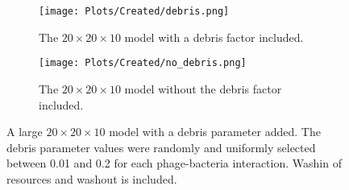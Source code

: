\begin{figure}
    \centering
    \begin{subfigure}{1\linewidth}
        \centering
        \texttt{[image: Plots/Created/debris.png]}
        \caption{
            The $20\times20\times10$ model with a debris factor included. 
        }
        \label{fig:created:debris_model}
    \end{subfigure}
    \hfill
    \begin{subfigure}{1\linewidth}
        \centering
        \texttt{[image: Plots/Created/no\_debris.png]}
        \caption{
            The $20\times20\times10$ model without the debris factor included. 
        }
        \label{fig:created:no_debris_model}
    \end{subfigure}
    \caption{
        A large $20\times20\times10$ model with a debris parameter added. 
        The debris parameter values were randomly and uniformly selected between 0.01 and 0.2 for each phage-bacteria interaction. 
        Washin of resources and washout is included. 
    }
    \label{fig:created:debris}
\end{figure}